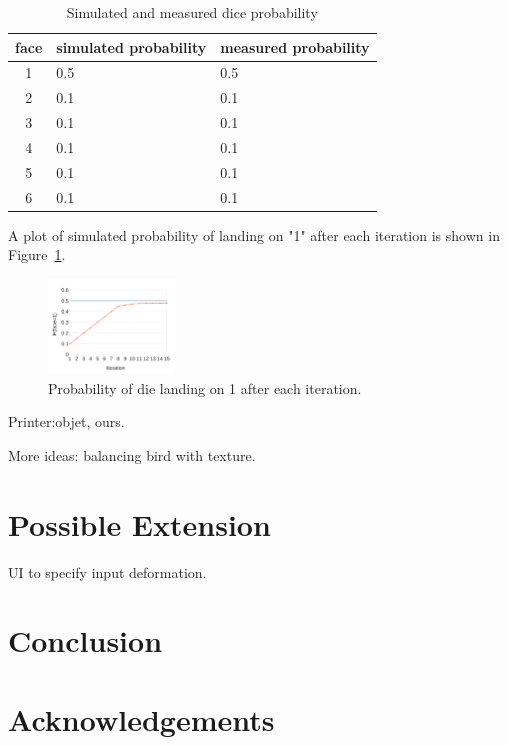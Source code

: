\documentclass[annual]{acmsiggraph}
\begin{document}
\begin{table}
\centering
  \begin{tabular}{ |c| p{0.7in} | p{0.7in} | }
  \hline
  face & simulated probability & measured probability\\
  \hline
  1 & 0.5 & 0.5\\
  \hline
  2 & 0.1 & 0.1\\
  \hline
  3 & 0.1 & 0.1\\
  \hline
  4 & 0.1 & 0.1\\
  \hline
  5 & 0.1 & 0.1\\
  \hline
  6 & 0.1 & 0.1\\

  \hline
  \end{tabular}
  \caption{Simulated and measured dice probability}
  \label{tab:dice}
\end{table}

A plot of simulated probability of landing on "1" after each iteration
is shown in Figure~\ref{fig:dieErr}.

\begin{figure}
	\centering
 	\includegraphics[width=0.3\textwidth]{figure/die.pdf}
\caption{Probability of die landing on 1 after each iteration.}
\label{fig:dieErr}
\end{figure}

Printer:objet, ours.

More ideas:
balancing bird with texture.
\section{Possible Extension}
UI to specify input deformation.
\section{Conclusion}
\section*{Acknowledgements}



\end{document}
